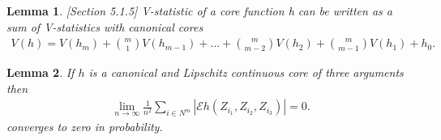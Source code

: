\documentclass{article} %
\newtheorem{lemma}{Lemma}
\newcommand{\ev}{\mathcal{E}}
\begin{document}
\begin{lemma}
\label{stm:decomposition}[Section 5.1.5]
 V-statistic of a core function h can be written as a sum of  V-statistics with canonical cores
\begin{align}
  V(h) = V(h_m) + \binom m 1 V(h_{m-1}) + ...+ \binom {m} {m-2} V(h_{2}) + \binom {m} {m-1} V(h_{1}) + h_0.
 \end{align}
\end{lemma}



\begin{lemma}
\label{lem:start}
 If $h$ is a canonical and Lipschitz continuous core of three arguments then
 \begin{align}
 \lim_{n \to \infty} \frac{1}{n^2} \sum_{i \in N^{m}} |\ev   h(Z_{i_1},Z_{i_2},Z_{i_3})| =0.
\end{align}
converges to zero in probability.
\end{lemma}
\end{document}
